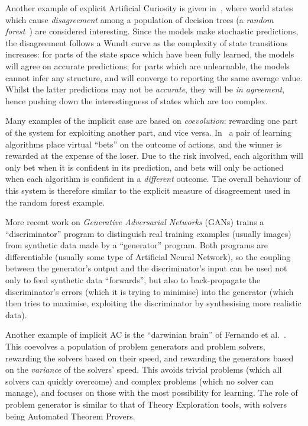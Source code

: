 Another example of explicit Artificial Curiosity is given
in~\cite{Hester.Stone:2012}, where world states which cause \emph{disagreement}
among a population of decision trees (a \emph{random
  forest}~\cite{randomforests}) are considered interesting. Since the models
make stochastic predictions, the disagreement follows a Wundt curve as the
complexity of state transitions increases: for parts of the state space which
have been fully learned, the models will agree on accurate predictions; for
parts which are unlearnable, the models cannot infer any structure, and will
converge to reporting the same average value. Whilst the latter predictions may
not be \emph{accurate}, they will be \emph{in agreement}, hence pushing down the
interestingness of states which are too complex.

Many examples of the implicit case are based on \emph{coevolution}: rewarding
one part of the system for exploiting another part, and vice versa. In~\cite{Schmidhuber1999} a pair of learning algorithms place virtual ``bets''
on the outcome of actions, and the winner is rewarded at the expense of the
loser. Due to the risk involved, each algorithm will only bet when it is
confident in its prediction, and bets will only be actioned when each algorithm
is confident in a \emph{different} outcome. The overall behaviour of this system
is therefore similar to the explicit measure of disagreement used in the random
forest example.

More recent work on \emph{Generative Adversarial Networks} (GANs) trains a
``discriminator'' program to distinguish real training examples (usually images)
from synthetic data made by a ``generator'' program. Both programs are
differentiable (usually some type of Artificial Neural Network), so the coupling
between the generator's output and the discriminator's input can be used not
only to feed synthetic data ``forwards'', but also to back-propagate the
discriminator's errors (which it is trying to minimise) into the generator
(which then tries to maximise, exploiting the discriminator by synthesising more
realistic data).

Another example of implicit AC is the ``darwinian brain'' of Fernando et
al.~\cite{fernando2013design1, fernando2013design2}. This coevolves a
population of problem generators and problem solvers, rewarding the solvers
based on their speed, and rewarding the generators based on the \emph{variance}
of the solvers' speed. This avoids trivial problems (which all solvers can
quickly overcome) and complex problems (which no solver can manage), and focuses
on those with the most possibility for learning. The role of problem generator
is similar to that of Theory Exploration tools, with solvers being Automated
Theorem Provers.



